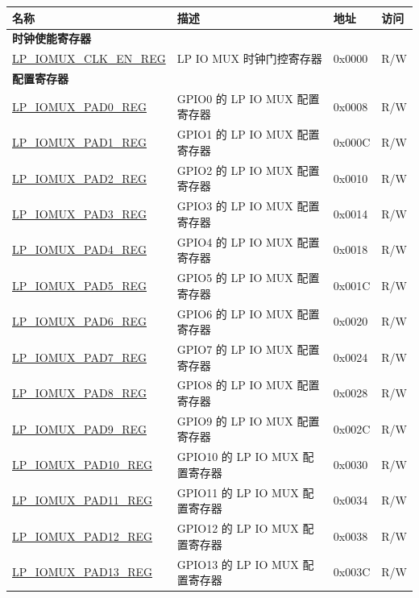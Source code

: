 \begin{longtable}{ | p{6cm} | p{7.2cm} | p{1.3cm} | p{1cm} | }
\hline\rowcolor{lightgray}
\textbf{名称} & \textbf{描述} &  \textbf{地址} & \textbf{访问} \\ \hline
\endhead
\multicolumn{4}{|l|}{\textbf{时钟使能寄存器}} \\ \hline
\hyperref[regdesc:LPIOMUXCLKENREG]{LP\_IOMUX\_CLK\_EN\_REG} & LP IO MUX 时钟门控寄存器 & 0x0000 & R/W \\ \hline
\multicolumn{4}{|l|}{\textbf{配置寄存器}} \\ \hline
\hyperref[regdesc:LPIOMUXPADNREG]{LP\_IOMUX\_PAD0\_REG} & GPIO0 的 LP IO MUX 配置寄存器 & 0x0008 & R/W \\ \hline
\hyperref[regdesc:LPIOMUXPADNREG]{LP\_IOMUX\_PAD1\_REG} & GPIO1 的 LP IO MUX 配置寄存器 & 0x000C & R/W \\ \hline
\hyperref[regdesc:LPIOMUXPADNREG]{LP\_IOMUX\_PAD2\_REG} & GPIO2 的 LP IO MUX 配置寄存器 & 0x0010 & R/W \\ \hline
\hyperref[regdesc:LPIOMUXPADNREG]{LP\_IOMUX\_PAD3\_REG} & GPIO3 的 LP IO MUX 配置寄存器 & 0x0014 & R/W \\ \hline
\hyperref[regdesc:LPIOMUXPADNREG]{LP\_IOMUX\_PAD4\_REG} & GPIO4 的 LP IO MUX 配置寄存器 & 0x0018 & R/W \\ \hline
\hyperref[regdesc:LPIOMUXPADNREG]{LP\_IOMUX\_PAD5\_REG} & GPIO5 的 LP IO MUX 配置寄存器 & 0x001C & R/W \\ \hline
\hyperref[regdesc:LPIOMUXPADNREG]{LP\_IOMUX\_PAD6\_REG} & GPIO6 的 LP IO MUX 配置寄存器 & 0x0020 & R/W \\ \hline
\hyperref[regdesc:LPIOMUXPADNREG]{LP\_IOMUX\_PAD7\_REG} & GPIO7 的 LP IO MUX 配置寄存器 & 0x0024 & R/W \\ \hline
\hyperref[regdesc:LPIOMUXPADNREG]{LP\_IOMUX\_PAD8\_REG} & GPIO8 的 LP IO MUX 配置寄存器 & 0x0028 & R/W \\ \hline
\hyperref[regdesc:LPIOMUXPADNREG]{LP\_IOMUX\_PAD9\_REG} & GPIO9 的 LP IO MUX 配置寄存器 & 0x002C & R/W \\ \hline
\hyperref[regdesc:LPIOMUXPADNREG]{LP\_IOMUX\_PAD10\_REG} & GPIO10 的 LP IO MUX 配置寄存器 & 0x0030 & R/W \\ \hline
\hyperref[regdesc:LPIOMUXPADNREG]{LP\_IOMUX\_PAD11\_REG} & GPIO11 的 LP IO MUX 配置寄存器 & 0x0034 & R/W \\ \hline
\hyperref[regdesc:LPIOMUXPADNREG]{LP\_IOMUX\_PAD12\_REG} & GPIO12 的 LP IO MUX 配置寄存器 & 0x0038 & R/W \\ \hline
\hyperref[regdesc:LPIOMUXPADNREG]{LP\_IOMUX\_PAD13\_REG} & GPIO13 的 LP IO MUX 配置寄存器 & 0x003C & R/W \\ \hline

\end{longtable}
